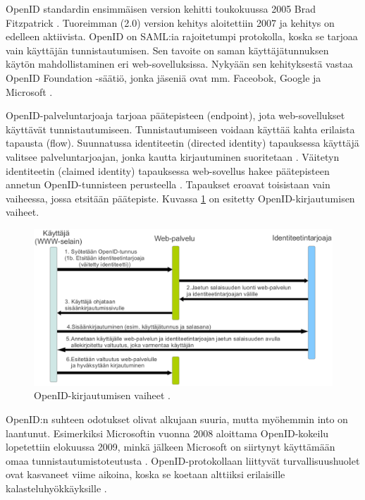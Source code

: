 OpenID standardin ensimmäisen version kehitti toukokuussa 2005 Brad Fitzpatrick \cite{openid}. Tuoreimman (2.0) version kehitys aloitettiin 2007 ja kehitys on edelleen aktiivista. OpenID on SAML:ia rajoitetumpi protokolla, koska se tarjoaa vain käyttäjän tunnistautumisen. Sen tavoite on saman käyttäjätunnuksen käytön mahdollistaminen eri web-sovelluksissa. Nykyään sen kehityksestä vastaa \mbox{OpenID} Foundation -säätiö, jonka jäseniä ovat mm. Faceobok, Google ja Microsoft \cite{openid_foundation}.

OpenID-palveluntarjoaja tarjoaa päätepisteen (endpoint), jota web-sovellukset käyttävät tunnistautumiseen. Tunnistautumiseen voidaan käyttää kahta erilaista tapausta (flow). Suunnatussa identiteetin (directed identity) tapauksessa käyttäjä valitsee palveluntarjoajan, jonka kautta kirjautuminen suoritetaan \cite{openid}. Väitetyn identiteetin (claimed identity) tapauksessa web-sovellus hakee päätepisteen annetun \mbox{OpenID}\--tun\-nis\-teen perusteella \cite{openid}. Tapaukset eroavat toisistaan vain vaiheessa, jossa etsitään päätepiste. Kuvassa \ref{openid_flow} on esitetty OpenID-kirjautumisen vaiheet.

\begin{figure}[ht]
\centering
\includegraphics[width=\textwidth]{teknologiat/protokollat/openid.eps}
\caption{OpenID-kirjautumisen vaiheet \cite{openid}.}%
\label{openid_flow}
\end{figure}

OpenID:n suhteen odotukset olivat alkujaan suuria, mutta myöhemmin into on laantunut. Esimerkiksi Microsoftin vuonna 2008 aloittama OpenID-kokeilu lopetettiin elokuussa 2009, minkä jälkeen Microsoft on siirtynyt käyttämään omaa tunnistautumistoteutusta \cite{openid_microsoft}. OpenID-protokollaan liittyvät turvallisuushuolet ovat kasvaneet viime aikoina, koska se koetaan alttiiksi erilaisille kalasteluhyökkäyksille \cite{billion_keys}.

